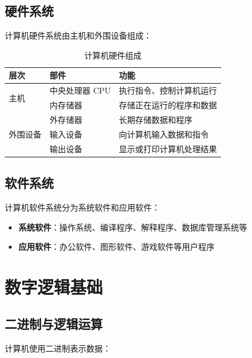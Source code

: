 \documentclass[12pt,UTF8]{ctexbook}
\begin{document}
\section{硬件系统}

计算机硬件系统由主机和外围设备组成：

\begin{table}[htbp]
    \centering
    \caption{计算机硬件组成}
    \begin{tabular}{|p{3cm}|p{3cm}|p{4cm}|}
        \hline
        \textbf{层次} & \textbf{部件} & \textbf{功能} \\
        \hline
        \multirow{2}{*}{主机} & 中央处理器 CPU & 执行指令、控制计算机运行 \\
        \cline{2-3}
         & 内存储器 & 存储正在运行的程序和数据 \\
        \hline
        \multirow{3}{*}{外围设备} & 外存储器 & 长期存储数据和程序 \\
        \cline{2-3}
         & 输入设备 & 向计算机输入数据和指令 \\
        \cline{2-3}
         & 输出设备 & 显示或打印计算机处理结果 \\
        \hline
    \end{tabular}
\end{table}

\section{软件系统}

计算机软件系统分为系统软件和应用软件：

\begin{itemize}[leftmargin=2cm]
    \item \textbf{系统软件}：操作系统、编译程序、解释程序、数据库管理系统等
    \item \textbf{应用软件}：办公软件、图形软件、游戏软件等用户程序
\end{itemize}

\chapter{数字逻辑基础}
\label{chap:logic}

\section{二进制与逻辑运算}

计算机使用二进制表示数据：
\end{document}
